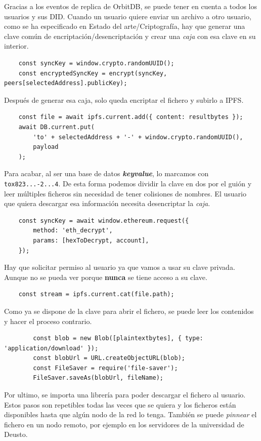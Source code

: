 \begin{enumerate}
    Gracias a los eventos de replica de OrbitDB, se puede tener en cuenta a todos los usuarios y sus DID.
    Cuando un usuario quiere enviar un archivo a otro usuario, como se ha especificado en Estado del arte/Criptografía, hay que generar una clave común de encriptación/desencriptación y crear una \textit{caja} con esa clave en su interior.
    \begin{lstlisting}
    const syncKey = window.crypto.randomUUID();
    const encryptedSyncKey = encrypt(syncKey, peers[selectedAddress].publicKey);
    \end{lstlisting}
    Después de generar esa caja, solo queda encriptar el fichero y subirlo a IPFS.
    \begin{lstlisting}
    const file = await ipfs.current.add({ content: resultbytes });
    await DB.current.put(
        'to' + selectedAddress + '-' + window.crypto.randomUUID(),
        payload
    );
    \end{lstlisting}
    Para acabar, al ser una base de datos \textbf{\textit{keyvalue}}, lo marcamos con \verb|tox823...-2...4|. De esta forma podemos dividir la clave en dos por el guión y leer múltiples ficheros sin necesidad de tener colisiones de nombres.
    El usuario que quiera descargar esa información necesita desencriptar la \textit{caja}.
    \begin{lstlisting}
    const syncKey = await window.ethereum.request({
		method: 'eth_decrypt',
		params: [hexToDecrypt, account],
    });
    \end{lstlisting}
    Hay que solicitar permiso al usuario ya que vamos a usar su clave privada. Aunque no se pueda ver porque \textbf{nunca} se tiene acceso a su clave.
    \begin{lstlisting}
    const stream = ipfs.current.cat(file.path);
    \end{lstlisting}
    Como ya se dispone de la clave para abrir el fichero, se puede leer los contenidos y hacer el proceso contrario.
    \begin{lstlisting}
        const blob = new Blob([plaintextbytes], { type: 'application/download' });
        const blobUrl = URL.createObjectURL(blob);
        const FileSaver = require('file-saver');
        FileSaver.saveAs(blobUrl, fileName);
    \end{lstlisting}
    Por ultimo, se importa una librería para poder descargar el fichero al usuario. 
    Estos pasos son repetibles todas las veces que se quiera y los ficheros están disponibles hasta que algún nodo de la red lo tenga. También se puede \textit{pinnear} el fichero en un nodo remoto, por ejemplo en los servidores de la universidad de Deusto.
\end{enumerate}
